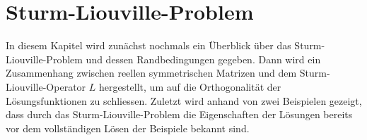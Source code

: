 %
%
%
\chapter{Sturm-Liouville-Problem\label{chapter:sturmliouville}}
\begin{refsection}
%
%
%
%
%

\noindent
In diesem Kapitel wird zunächst nochmals ein Überblick über das
Sturm-Liouville-Problem und dessen Randbedingungen gegeben.
Dann wird ein Zusammenhang zwischen reellen symmetrischen Matrizen und
dem Sturm-Liouville-Operator $L$ hergestellt, um auf die Orthogonalität der
Lösungsfunktionen zu schliessen.
Zuletzt wird anhand von zwei Beispielen gezeigt, dass durch das
Sturm-Liouville-Problem die Eigenschaften der Lösungen bereits vor dem
vollständigen Lösen der Beispiele bekannt sind.









\printbibliography[heading=subbibliography]
\end{refsection}
